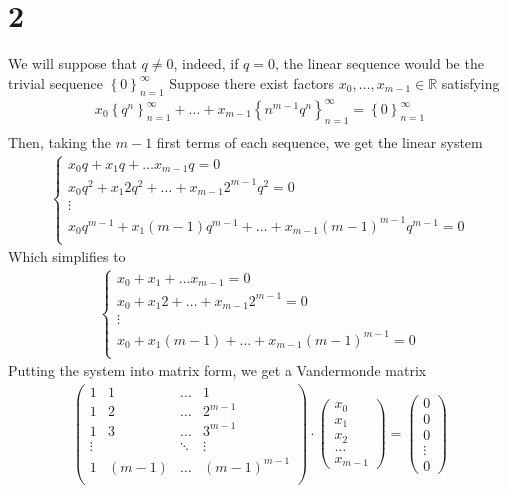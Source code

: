 \documentclass[11pt, a4paper]{article}
\begin{document}
\section*{2}
We will suppose that $q\neq 0$, indeed, if $q=0$, the linear sequence would be the trivial sequence $ \left\{ 0 \right\}_{n=1}^{ \infty }$
Suppose there exist factors $x_0,\ldots,x_{m-1} \in \mathbb{R}$ satisfying
\begin{align*}
x_0 \left\{ q^{n} \right\}_{n=1}^{ \infty }  + \ldots + x_{m-1} \left\{ n^{m-1} q^{n} \right\}_{n=1}^{ \infty } = \left\{ 0 \right\}_{n=1}^{ \infty } \\
\end{align*}
Then, taking the $m-1$ first terms of each sequence, we get the linear system
\begin{align*}
\begin{cases}
x_0 q + x_1 q + \ldots x_{m-1} q = 0\\
x_0 q^{2} + x_1 2 q^{2} + \ldots +x_{m-1} 2^{m-1} q^{2} = 0\\
\vdots\\
x_0 q^{m-1} + x_1 ( m-1) q^{m-1} + \ldots +x_{m-1} ( m-1) ^{m-1} q^{m-1} = 0\\
\end{cases}
\end{align*}
Which simplifies to
\begin{align*}
\begin{cases}
x_0  + x_1  + \ldots x_{m-1}  = 0\\
x_0  + x_1 2  + \ldots+ x_{m-1} 2^{m-1}  = 0\\
\vdots\\
x_0  + x_1 ( m-1) + \ldots +x_{m-1} ( m-1) ^{m-1}  = 0\\
\end{cases}
\end{align*}
Putting the system into matrix form, we get a Vandermonde matrix
\begin{align*}
\begin{pmatrix}
	1 & 1 & \ldots & 1 \\
	1 &2 & \ldots & 2^{m-1}\\
	1 &3 & \ldots & 3^{m-1}\\
	\vdots & & \ddots & \vdots \\
	1 & ( m-1)  & \ldots & ( m-1) ^{m-1}\\
\end{pmatrix}
\cdot 
\begin{pmatrix}
x_0 \\ x_1 \\ x_2 \\ \ldots \\ x_{m-1} 
\end{pmatrix}
= 
\begin{pmatrix}
0 \\ 0 \\ 0 \\ \vdots \\ 0
\end{pmatrix}
\end{align*}
\end{document}
